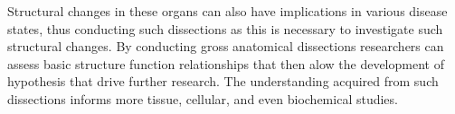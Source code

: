 \documentclass[12pt]{article}
\begin{document}
\par{}
Structural changes in these organs can also have implications in various disease states, thus conducting such dissections as this is necessary to investigate such structural changes. By conducting gross anatomical dissections researchers can assess basic structure function relationships that then alow the development of hypothesis that drive further research. The understanding acquired from such dissections informs more tissue, cellular, and even biochemical studies.





\end{document}
